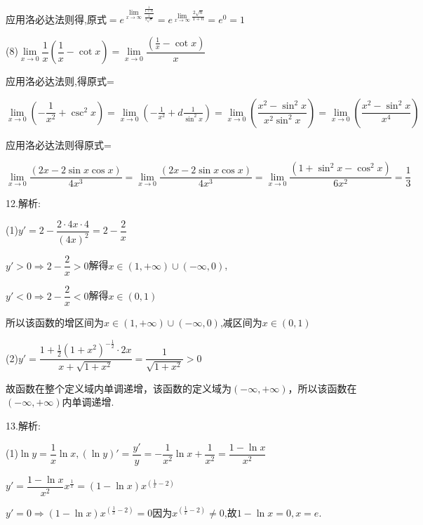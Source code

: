 应用洛必达法则得,原式$ = {e^{\mathop {\lim }\limits_{x \to \infty } \frac{{\frac{1}{{1 + n}}}}{{\frac{1}{{2\sqrt n }}}}}} = {e^{\mathop {\lim }\limits_{x \to \infty } \frac{{2\sqrt n }}{{1 + n}}}} = {e^0} = 1$

(8)$\mathop {\lim }\limits_{x \to 0} \dfrac{1}{x}(\dfrac{1}{x} - \cot x) = \mathop {\lim }\limits_{x \to 0} \dfrac{{(\frac{1}{x} - \cot x)}}{x}$

应用洛必达法则,得原式=

$\mathop {\lim }\limits_{x \to 0} \left( { - \dfrac{1}{{{x^2}}} + {{\csc }^2}x} \right) = \mathop {\lim }\limits_{x \to 0} \left( { - \frac{1}{{{x^2}}} + d\frac{1}{{{{\sin }^2}x}}} \right) = \mathop {\lim }\limits_{x \to 0} \left( {\dfrac{{{x^2} - {{\sin }^2}x}}{{{x^2}{{\sin }^2}x}}} \right) = \mathop {\lim }\limits_{x \to 0} \left( {\dfrac{{{x^2} - {{\sin }^2}x}}{{{x^4}}}} \right)$

应用洛必达法则得原式=

$\mathop {\lim }\limits_{x \to 0} \dfrac{{(2x - 2\sin x\cos x)}}{{4{x^3}}} = \mathop {\lim }\limits_{x \to 0} \dfrac{{(2x - 2\sin x\cos x)}}{{4{x^3}}} = \mathop {\lim }\limits_{x \to 0} \dfrac{{(1 + {{\sin }^2}x - {{\cos }^2}x)}}{{6{x^2}}} = \dfrac{1}{3}$

12.解析:

(1)$y' = 2 - \dfrac{{2 \cdot 4x \cdot 4}}{{{{(4x)}^2}}} = 2 - \dfrac{2}{x}$

$y' > 0 \Rightarrow 2 - \dfrac{2}{x} > 0$解得$x \in (1, + \infty ) \cup ( - \infty ,0)$,

$y' < 0 \Rightarrow 2 - \dfrac{2}{x} < 0$解得$x \in (0,1)$

所以该函数的增区间为$x \in (1, + \infty ) \cup ( - \infty ,0)$,减区间为$x \in (0,1)$

(2)$y' = \dfrac{{1 + \frac{1}{2}{{(1 + {x^2})}^{ - \frac{1}{2}}} \cdot 2x}}{{x + \sqrt {1 + {x^2}} }} = \dfrac{1}{{\sqrt {1 + {x^2}} }} > 0$

故函数在整个定义域内单调递增，该函数的定义域为$( - \infty , + \infty )$，所以该函数在$( - \infty , + \infty )$内单调递增.

13.解析:

(1)$\ln y = \dfrac{1}{x}\ln x,(\ln y)' = \dfrac{{y'}}{y} =  - \dfrac{1}{{{x^2}}}\ln x + \dfrac{1}{{{x^2}}} = \dfrac{{1 - \ln x}}{{{x^2}}}$

$y' = \dfrac{{1 - \ln x}}{{{x^2}}}{x^{\frac{1}{x}}} = (1 - \ln x){x^{(\frac{1}{x} - 2)}}$

$y' = 0 \Rightarrow (1 - \ln x){x^{(\frac{1}{x} - 2)}} = 0$因为${x^{(\frac{1}{x} - 2)}} \ne 0$,故$1 - \ln x = 0,x = e$.

